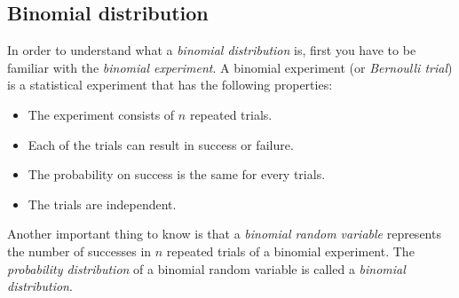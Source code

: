\documentclass[12pt, a4paper,leqno]{report}
\theoremstyle{normal}
\theoremstyle{normal}
\begin{document}
	\subsection{Binomial distribution}
	In order to understand what a \textit{binomial distribution} is, first you have to be familiar with the \textit{binomial experiment}. A binomial experiment (or \textit{Bernoulli trial}) is a statistical experiment that has the following properties:
	\begin{itemize}
		\item The experiment consists of $n$ repeated trials.
		\item Each of the trials can result in success or failure.
		\item The probability on success is the same for every trials.
		\item The trials are independent.
	\end{itemize}
	Another important thing to know is that a \textit{binomial random variable} represents the number of successes in $n$ repeated trials of a binomial experiment. The \textit{probability distribution} of a binomial random variable is called a \textit{binomial distribution}.
\end{document}
